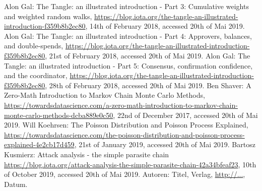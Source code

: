 \begin{thebibliography}{99}
 Alon Gal: The Tangle: an illustrated introduction - Part 3: Cumulative weights and weighted random walks, \url{https://blog.iota.org/the-tangle-an-illustrated-introduction-f359b8b2ec80}, 14th of February 2018, accessed 20th of Mai 2019.
 Alon Gal: The Tangle: an illustrated introduction - Part 4: Approvers, balances, and double-spends, \url{https://blog.iota.org/the-tangle-an-illustrated-introduction-f359b8b2ec80}, 21st of February 2018, accessed 20th of Mai 2019.
 Alon Gal: The Tangle: an illustrated introduction - Part 5: Consensus, confirmation confidence, and the coordinator, \url{https://blog.iota.org/the-tangle-an-illustrated-introduction-f359b8b2ec80}, 28th of February 2018, accessed 20th of Mai 2019.
 Ben Shaver: A Zero-Math Introduction to Markov Chain Monte Carlo Methods, \url{https://towardsdatascience.com/a-zero-math-introduction-to-markov-chain-monte-carlo-methods-dcba889e0c50}, 22nd of December 2017, accessed 20th of Mai 2019.
 Will Koehrsen: The Poisson Distribution and Poisson Process Explained, \url{https://towardsdatascience.com/the-poisson-distribution-and-poisson-process-explained-4e2cb17d459}, 21st of January 2019, accessed 20th of Mai 2019.
 Bartosz Kusmierz: Attack analysis - the simple parasite chain \url{https://blog.iota.org/attack-analysis-the-simple-parasite-chain-42a34bfeaf23}, 10th of October 2019, accessed 20th of Mai 2019.
 Autoren: Titel, Verlag, \url{http://...}, Datum.


\end{thebibliography}

